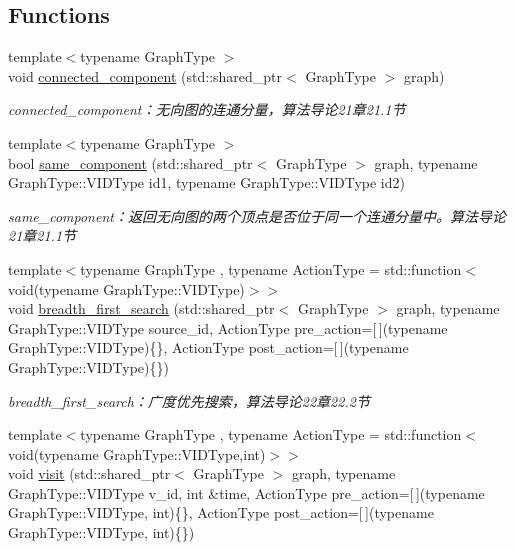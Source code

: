 \subsection*{Functions}
\begin{DoxyCompactItemize}
\item 
{\footnotesize template$<$typename Graph\+Type $>$ }\\void \hyperlink{namespace_introduction_to_algorithm_1_1_graph_algorithm_a31fe8fc6f732112632c51221e739a7d4}{connected\+\_\+component} (std\+::shared\+\_\+ptr$<$ Graph\+Type $>$ graph)
\begin{DoxyCompactList}\small\item\em connected\+\_\+component：无向图的连通分量，算法导论21章21.1节 \end{DoxyCompactList}\item 
{\footnotesize template$<$typename Graph\+Type $>$ }\\bool \hyperlink{namespace_introduction_to_algorithm_1_1_graph_algorithm_ac368f242de9f06c7d936cba4aa0ab40b}{same\+\_\+component} (std\+::shared\+\_\+ptr$<$ Graph\+Type $>$ graph, typename Graph\+Type\+::\+V\+I\+D\+Type id1, typename Graph\+Type\+::\+V\+I\+D\+Type id2)
\begin{DoxyCompactList}\small\item\em same\+\_\+component：返回无向图的两个顶点是否位于同一个连通分量中。算法导论21章21.1节 \end{DoxyCompactList}\item 
{\footnotesize template$<$typename Graph\+Type , typename Action\+Type  = std\+::function$<$ void(typename Graph\+Type\+::\+V\+I\+D\+Type)$>$$>$ }\\void \hyperlink{namespace_introduction_to_algorithm_1_1_graph_algorithm_a9c57b397479972f84b4b10bc19968297}{breadth\+\_\+first\+\_\+search} (std\+::shared\+\_\+ptr$<$ Graph\+Type $>$ graph, typename Graph\+Type\+::\+V\+I\+D\+Type source\+\_\+id, Action\+Type pre\+\_\+action=\mbox{[}$\,$\mbox{]}(typename Graph\+Type\+::\+V\+I\+D\+Type)\{\}, Action\+Type post\+\_\+action=\mbox{[}$\,$\mbox{]}(typename Graph\+Type\+::\+V\+I\+D\+Type)\{\})
\begin{DoxyCompactList}\small\item\em breadth\+\_\+first\+\_\+search：广度优先搜索，算法导论22章22.2节 \end{DoxyCompactList}\item 
{\footnotesize template$<$typename Graph\+Type , typename Action\+Type  = std\+::function$<$void(typename Graph\+Type\+::\+V\+I\+D\+Type,int)$>$$>$ }\\void \hyperlink{namespace_introduction_to_algorithm_1_1_graph_algorithm_af651a2b435fc270ab711e573d83a385d}{visit} (std\+::shared\+\_\+ptr$<$ Graph\+Type $>$ graph, typename Graph\+Type\+::\+V\+I\+D\+Type v\+\_\+id, int \&time, Action\+Type pre\+\_\+action=\mbox{[}$\,$\mbox{]}(typename Graph\+Type\+::\+V\+I\+D\+Type, int)\{\}, Action\+Type post\+\_\+action=\mbox{[}$\,$\mbox{]}(typename Graph\+Type\+::\+V\+I\+D\+Type, int)\{\})

\end{DoxyCompactItemize}
